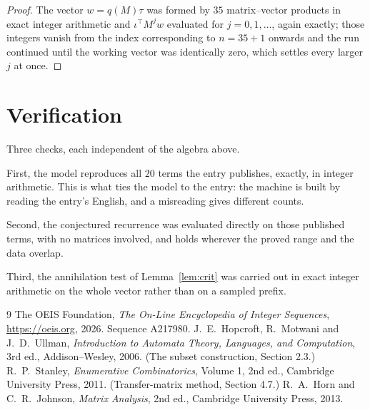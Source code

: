 \documentclass[11pt,a4paper]{article}
\theoremstyle{plain}
\theoremstyle{definition}
\begin{document}
\begin{proof}
The vector $w=q(M)\tau$ was formed by $35$ matrix--vector products in exact integer
arithmetic and $\iota^{\!\top}M^{j}w$ evaluated for $j=0,1,\dots$, again exactly; those
integers vanish from the index corresponding to $n=35+1$ onwards and the run continued
until the working vector was identically zero, which settles every larger $j$ at once.
\end{proof}

\section{Verification}

Three checks, each independent of the algebra above.

First, the model reproduces all $20$ terms the entry publishes, exactly, in integer
arithmetic. This is what ties the model to the entry: the machine is built by reading the
entry's English, and a misreading gives different counts.

Second, the conjectured recurrence was evaluated directly on those published terms, with no
matrices involved, and holds wherever the proved range and the data overlap.

Third, the annihilation test of Lemma~\ref{lem:crit} was carried out in exact integer
arithmetic on the whole vector rather than on a sampled prefix.

\begin{thebibliography}{9}
 The OEIS Foundation, \emph{The On-Line Encyclopedia of Integer
Sequences}, \url{https://oeis.org}, 2026. Sequence A217980.
 J.~E.~Hopcroft, R.~Motwani and J.~D.~Ullman, \emph{Introduction to Automata
Theory, Languages, and Computation}, 3rd ed., Addison--Wesley, 2006. (The subset
construction, Section 2.3.)
 R.~P.~Stanley, \emph{Enumerative Combinatorics}, Volume 1, 2nd ed.,
Cambridge University Press, 2011. (Transfer-matrix method, Section 4.7.)
 R.~A.~Horn and C.~R.~Johnson, \emph{Matrix Analysis}, 2nd ed., Cambridge
University Press, 2013.
\end{thebibliography}
\end{document}
